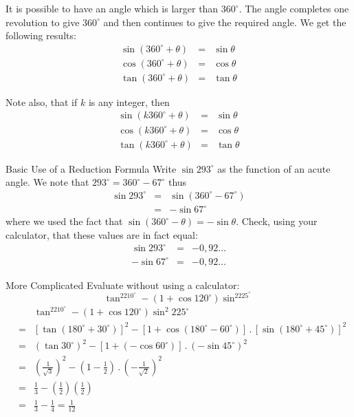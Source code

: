 It is possible to have an angle which is larger than $360^\circ$. The angle completes one revolution to give $360^\circ$ and then continues to give the required angle. We get the following results:
\begin{eqnarray*}
 \sin(360^\circ+\theta) &=& \sin\theta \\
 \cos(360^\circ+\theta) &=& \cos\theta \\
 \tan(360^\circ+\theta) &=& \tan\theta
\end{eqnarray*}

Note also, that if $k$ is any integer, then
\begin{eqnarray*}
 \sin(k360^\circ +\theta) &=& \sin\theta \\
 \cos(k360^\circ +\theta) &=& \cos\theta \\
 \tan(k360^\circ +\theta) &=& \tan\theta
\end{eqnarray*}

\begin{wex}{Basic Use of a Reduction Formula}
{%
Write $\sin 293^\circ$ as the function of an acute angle.
}%
{%
We note that $293^\circ = 360^\circ -67^\circ$ thus
\begin{eqnarray*}
 \sin 293^\circ & = & \sin (360^\circ - 67^\circ)\\
 & =& -\sin 67^\circ 
\end{eqnarray*}
where we used the fact that $ \sin (360^\circ -\theta) = -\sin\theta$. Check, using your calculator, that these values are in fact equal:
\begin{eqnarray*}
\sin 293^\circ &=& -0,92\ldots \\
-\sin 67^\circ &=& -0,92\ldots
\end{eqnarray*}
}%
\end{wex}

\begin{wex}{More Complicated}
{%
Evaluate without using a calculator: 
\[\tan^2210^\circ-(1+\cos 120^\circ)\sin ^2225^\circ\]
}%
{%
\begin{eqnarray*}
& & \tan^2210^\circ-(1+\cos 120^\circ)\sin^2 225^\circ\\
&=& [\tan(180^\circ+30^\circ)]^2-[1+\cos(180^\circ-60^\circ)]\,.\,[ \sin(180^\circ+45^\circ)]^2\\
&=& (\tan 30^\circ)^2 - [1+(-\cos 60^\circ)] \,.\, (-\sin 45^\circ)^2\\
&=& \left( \frac{1}{\sqrt{3}} \right)^2 - \left(1-\frac{1}{2}\right)\,.\, \left( -\frac{1}{\sqrt{2}}\right)^2 \\
&=& \frac{1}{3} - \left( \frac{1}{2} \right) \left(\frac{1}{2} \right) \\
&=& \frac{1}{3} - \frac{1}{4} = \frac{1}{12}
\end{eqnarray*}
}%
\end{wex}

